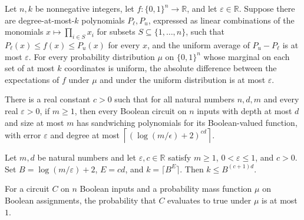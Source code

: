 \begin{theorem}
\label{Sandwiching_Implies_Fooling}
\leanok
{}
Let $n,k$ be nonnegative integers, let $f:\{0,1\}^n\to\mathbb{R}$, and let
$\varepsilon\in\mathbb{R}$. Suppose there are degree-at-most-$k$ polynomials
$P_\ell,P_u$, expressed as linear combinations of the monomials $x\mapsto\prod_{i\in
S}x_i$ for subsets $S\subseteq\{1,\ldots,n\}$, such that $P_\ell(x)\le f(x)\le P_u(x)$
for every $x$, and the uniform average of $P_u-P_\ell$ is at most $\varepsilon$. For
every probability distribution $\mu$ on $\{0,1\}^n$ whose marginal on each set of at
most $k$ coordinates is uniform, the absolute difference between the expectations of $f$
under $\mu$ and under the uniform distribution is at most $\varepsilon$.
\end{theorem}

\begin{definition}
\label{BravermanProperty}
\leanok
{}
There is a real constant $c>0$ such that for all natural numbers $n,d,m$ and every real
$ε>0$, if $m\ge1$, then every Boolean circuit on $n$ inputs with depth at most
$d$ and size at most $m$ has sandwiching polynomials for its Boolean-valued function,
with error $ε$ and degree at most
$\left\lceil\left(\log(m/\epsilon)+2\right)^{cd}\right\rceil$.
\end{definition}

\begin{lemma}
\label{Braverman_Bound_Helper}
\leanok
{}
Let $m,d$ be natural numbers and let $\varepsilon,c\in\mathbb{R}$ satisfy $m\geq1$,
$0<\varepsilon\leq1$, and $c>0$. Set $B=\log(m/\varepsilon)+2$, $E=cd$, and $k=\lceil
B^E\rceil$. Then $k\leq B^{(c+1)d}$.
\end{lemma}

\begin{lemma}
\label{Circuit.prob_le_one}
\leanok
{}
For a circuit $C$ on $n$ Boolean inputs and a probability mass function $\mu$ on Boolean
assignments, the probability that $C$ evaluates to true under $\mu$ is at most $1$.
\end{lemma}

